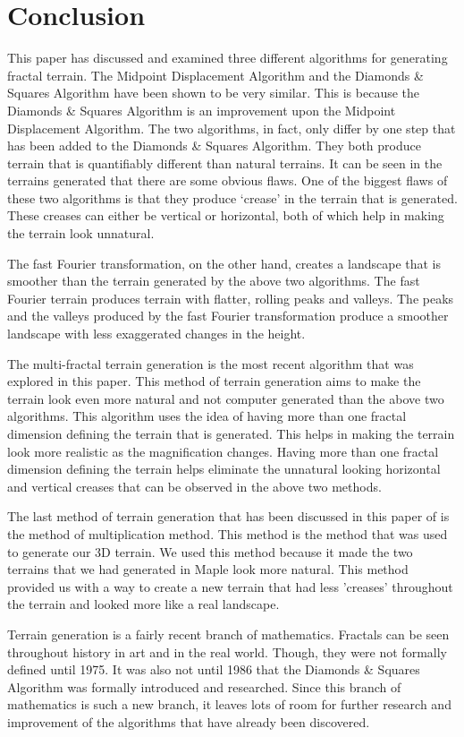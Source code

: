 \documentclass[11pt,twocolumn]{article}
\begin{document}
	\section{Conclusion}
	\label{sec:conclusion}
	This paper has discussed and examined three different algorithms for generating fractal terrain.
	The Midpoint Displacement Algorithm and the Diamonds \& Squares Algorithm have been shown to be very similar.
	This is because the Diamonds \& Squares Algorithm is an improvement upon the Midpoint Displacement Algorithm.
	The two algorithms, in fact, only differ by one step that has been added to the Diamonds \& Squares Algorithm.
	They both produce terrain that is quantifiably different than natural terrains. It can be seen in the terrains
	generated that there are some obvious flaws. One of the biggest flaws of these two algorithms is that they produce
	`crease' in the terrain that is generated. These creases can either be vertical or horizontal, both of which help
	in making the terrain look unnatural. 
   
	The fast Fourier transformation, on the other hand, creates a landscape that is smoother than the terrain generated
	by the above two algorithms. The fast Fourier terrain produces terrain with flatter, rolling peaks and valleys. The peaks
	and the valleys produced by the fast Fourier transformation produce a smoother landscape with less exaggerated changes in
	the height. 
   
	The multi-fractal terrain generation is the most recent algorithm that was explored in this paper. This method of terrain
	generation aims to make the terrain look even more natural and not computer generated than the above two algorithms. This
	algorithm uses the idea of having more than one fractal dimension defining the terrain that is generated. This helps in making
	the terrain look more realistic as the magnification changes. Having more than one fractal dimension defining the terrain helps
	eliminate the unnatural looking horizontal and vertical creases that can be observed in the above two methods.
  
	The last method of terrain generation that has been discussed in this paper of  is the method of multiplication method. This method is the method that was used to generate our 3D terrain. We used this method because it made the two terrains that we had generated in Maple look more natural. This method provided us with a way to create a new terrain that had less 'creases' throughout the terrain and looked more like a real landscape.

     
    Terrain generation is a fairly recent branch of mathematics. Fractals can be seen throughout history in art and in the real world.
	Though, they were not formally defined until 1975. It was also not until 1986 that the Diamonds \& Squares Algorithm was formally introduced
	and researched. Since this branch of mathematics is such a new branch, it leaves lots of room for further research and improvement of
	the algorithms that have already been discovered.	
	    
    
    
\end{document}
